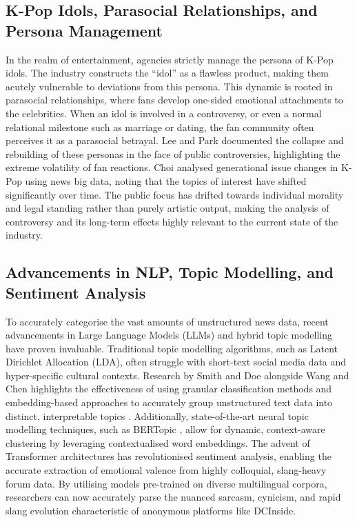\documentclass[9pt,twoside,lineno]{pnas-new}
\begin{document}
\begin{article}
\subsection*{K-Pop Idols, Parasocial Relationships, and Persona Management}
In the realm of entertainment, agencies strictly manage the persona of K-Pop idols. The industry constructs the ``idol'' as a flawless product, making them acutely vulnerable to deviations from this persona. This dynamic is rooted in parasocial relationships, where fans develop one-sided emotional attachments to the celebrities. When an idol is involved in a controversy, or even a normal relational milestone such as marriage or dating, the fan community often perceives it as a parasocial betrayal. Lee and Park \cite{kpop_persona} documented the collapse and rebuilding of these personas in the face of public controversies, highlighting the extreme volatility of fan reactions. Choi \cite{kpop_generation_news} analysed generational issue changes in K-Pop using news big data, noting that the topics of interest have shifted significantly over time. The public focus has drifted towards individual morality and legal standing rather than purely artistic output, making the analysis of controversy and its long-term effects highly relevant to the current state of the industry.

\subsection*{Advancements in NLP, Topic Modelling, and Sentiment Analysis}
To accurately categorise the vast amounts of unstructured news data, recent advancements in Large Language Models (LLMs) and hybrid topic modelling have proven invaluable. Traditional topic modelling algorithms, such as Latent Dirichlet Allocation (LDA), often struggle with short-text social media data and hyper-specific cultural contexts. Research by Smith and Doe \cite{llm_topic_modeling} alongside Wang and Chen \cite{multi_granularity_topic} highlights the effectiveness of using granular classification methods and embedding-based approaches to accurately group unstructured text data into distinct, interpretable topics \cite{granularity_algorithm}. Additionally, state-of-the-art neural topic modelling techniques, such as BERTopic \cite{grootendorst2022bertopic}, allow for dynamic, context-aware clustering by leveraging contextualised word embeddings. The advent of Transformer architectures \cite{wolf2019huggingface} has revolutionised sentiment analysis, enabling the accurate extraction of emotional valence from highly colloquial, slang-heavy forum data. By utilising models pre-trained on diverse multilingual corpora, researchers can now accurately parse the nuanced sarcasm, cynicism, and rapid slang evolution characteristic of anonymous platforms like DCInside.


\end{article}
\end{document}
